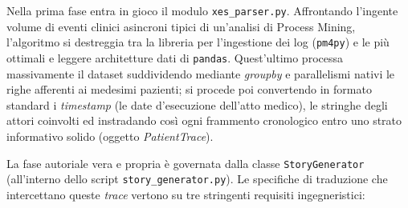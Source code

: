 Nella prima fase entra in gioco il modulo \texttt{xes\_parser.py}. Affrontando l'ingente volume di eventi clinici asincroni tipici di un'analisi di Process Mining, l'algoritmo si destreggia tra la libreria per l'ingestione dei log (\texttt{pm4py}) e le più ottimali e leggere architetture dati di \texttt{pandas}. Quest'ultimo processa massivamente il dataset suddividendo mediante \textit{groupby} e parallelismi nativi le righe afferenti ai medesimi pazienti; si procede poi convertendo in formato standard i \textit{timestamp} (le date d'esecuzione dell'atto medico), le stringhe degli attori coinvolti ed instradando così ogni frammento cronologico entro uno strato informativo solido (oggetto \textit{PatientTrace}).  

La fase autoriale vera e propria è governata dalla classe \texttt{StoryGenerator} (all'interno dello script \texttt{story\_generator.py}). Le specifiche di traduzione che intercettano queste \textit{trace} vertono su tre stringenti requisiti ingegneristici:
